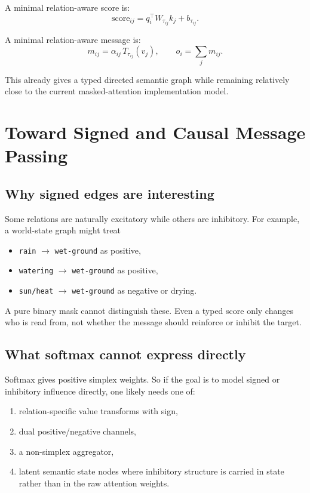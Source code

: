 \documentclass[11pt]{article}
\begin{document}
A minimal relation-aware score is:
\[
\mathrm{score}_{ij}
=
q_i^\top W_{\tau_{ij}} k_j + b_{\tau_{ij}}.
\]

A minimal relation-aware message is:
\[
m_{ij}
=
\alpha_{ij}\, T_{\tau_{ij}}(v_j),
\qquad
o_i = \sum_{j} m_{ij}.
\]

This already gives a typed directed semantic graph while remaining relatively
close to the current masked-attention implementation model.

\section{Toward Signed and Causal Message Passing}

\subsection{Why signed edges are interesting}

Some relations are naturally excitatory while others are inhibitory. For
example, a world-state graph might treat
\begin{itemize}[leftmargin=1.5em]
    \item \texttt{rain} $\to$ \texttt{wet-ground} as positive,
    \item \texttt{watering} $\to$ \texttt{wet-ground} as positive,
    \item \texttt{sun/heat} $\to$ \texttt{wet-ground} as negative or drying.
\end{itemize}

A pure binary mask cannot distinguish these. Even a typed score only changes who
is read from, not whether the message should reinforce or inhibit the target.

\subsection{What softmax cannot express directly}

Softmax gives positive simplex weights. So if the goal is to model signed or
inhibitory influence directly, one likely needs one of:
\begin{enumerate}[leftmargin=1.5em]
    \item relation-specific value transforms with sign,
    \item dual positive/negative channels,
    \item a non-simplex aggregator,
    \item latent semantic state nodes where inhibitory structure is carried in
    state rather than in the raw attention weights.
\end{enumerate}
\end{document}
